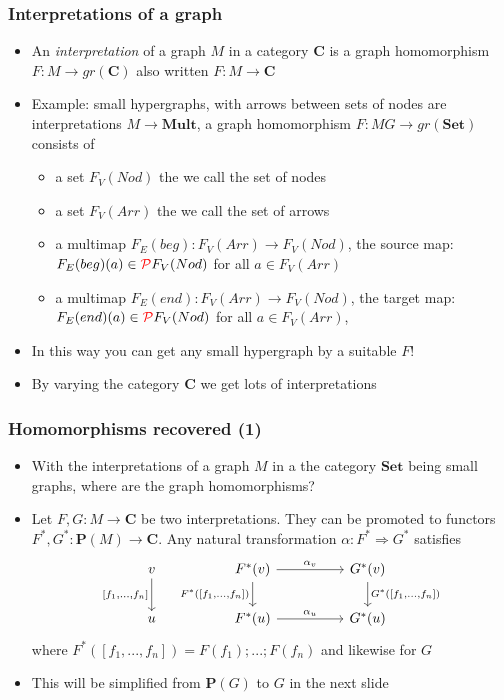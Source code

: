 \documentclass[handout]{beamer}
\newcommand{\To}{\Rightarrow}
\newcommand{\bfsf}[1]{{\boldsymbol{#1}}}
\newcommand{\Set}{\bfsf{Set}}
\newcommand{\CC}{\bfsf{C}}
\newcommand{\PP}{\bfsf{P}}
\newcommand{\Mult}{\bfsf{Mult}}
\begin{document}
\frame
  {   
    \frametitle{Interpretations  of a graph}\label{Ch3:interpretations}

 \begin{itemize}[<+->]
\item An \emph{interpretation} of a graph $M$ in a category $\CC$
is a graph homomorphism $F: M\to gr(\CC)$ also written $F : M\to \CC$
\item Example: small hypergraphs, with arrows  between sets of nodes
are interpretations $M\to \Mult$, 
a graph homomorphism $F : MG\to gr(\Set)$ consists of
   \begin{itemize}[<+->]
\item a set $F_V(Nod)$ the we call the set of nodes
\item a set $F_V(Arr)$ the we call the set of arrows
\item a multimap $F_E(beg) : F_V(Arr)\to F_V(Nod)$, the source map:  
$F_E(beg)(a)\in {\color{red}\operatorname{\mathcal{P}}} F_V(Nod)$ for all $a\in F_V(Arr)$
\item a multimap $F_E(end) : F_V(Arr)\to F_V(Nod)$, the target map: 
 $F_E(end)(a)\in {\color{red}\operatorname{\mathcal{P}}} F_V(Nod)$  for all $a\in F_V(Arr)$,
   \end{itemize}
\item In this way you can get any small {\color{red}hyper}graph by a suitable $F$!
\item By varying the category $\CC$ we get lots of interpretations
 \end{itemize}

 }

\frame
  {   
    \frametitle{Homomorphisms recovered (1)}\label{Ch3:Homs1}

 \begin{itemize}[<+->]
\item With the {interpretations} of a graph $M$ in a the category $\Set$
being small graphs, where are the graph homomorphisms?
\item Let $F,G : M\to \CC$ be two interpretations. They can be promoted
to functors $F^*,G^* : \PP(M)\to \CC$. Any natural transformation
$\alpha: F^* \To G^*$ satisfies
\[
\begin{tikzcd}[ampersand replacement=\&]
v \arrow[swap]{d}{[f_1,...,f_n]} \&\& {F^*(v)}  \arrow[swap]{d}{F^*([f_1,...,f_n])}\arrow{rr}{\alpha_v} 
\&\& {G^*(v})\arrow{d}{G^*([f_1,...,f_n])}\\
u \&\&{F^*(u)}  \arrow{rr}{\alpha_u}\& \& {G^*(u)}
\end{tikzcd}
\]
where $F^*([f_1,...,f_n]) = F(f_1);...;F(f_n)$ and likewise for $G$
\item This will be simplified from $\PP(G)$ to $G$ in the next slide
 \end{itemize}

 }
\end{document}
